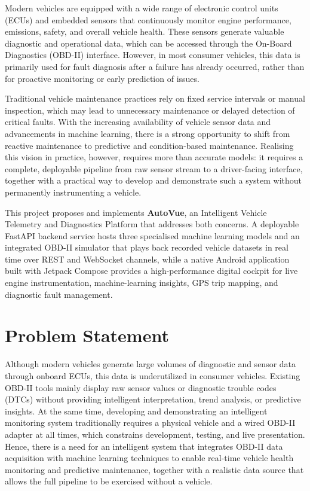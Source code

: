 \documentclass[10pt,a4paper]{report}
\begin{document}
Modern vehicles are equipped with a wide range of electronic control units (ECUs) and embedded sensors that continuously monitor engine performance, emissions, safety, and overall vehicle health. These sensors generate valuable diagnostic and operational data, which can be accessed through the On-Board Diagnostics (OBD-II) interface. However, in most consumer vehicles, this data is primarily used for fault diagnosis after a failure has already occurred, rather than for proactive monitoring or early prediction of issues.
\par
Traditional vehicle maintenance practices rely on fixed service intervals or manual inspection, which may lead to unnecessary maintenance or delayed detection of critical faults. With the increasing availability of vehicle sensor data and advancements in machine learning, there is a strong opportunity to shift from reactive maintenance to predictive and condition-based maintenance. Realising this vision in practice, however, requires more than accurate models: it requires a complete, deployable pipeline from raw sensor stream to a driver-facing interface, together with a practical way to develop and demonstrate such a system without permanently instrumenting a vehicle.
\par
This project proposes and implements \textbf{AutoVue}, an Intelligent Vehicle Telemetry and Diagnostics Platform that addresses both concerns. A deployable FastAPI backend service hosts three specialised machine learning models and an integrated OBD-II simulator that plays back recorded vehicle datasets in real time over REST and WebSocket channels, while a native Android application built with Jetpack Compose provides a high-performance digital cockpit for live engine instrumentation, machine-learning insights, GPS trip mapping, and diagnostic fault management.

\section{Problem Statement}

Although modern vehicles generate large volumes of diagnostic and sensor data through onboard ECUs, this data is underutilized in consumer vehicles. Existing OBD-II tools mainly display raw sensor values or diagnostic trouble codes (DTCs) without providing intelligent interpretation, trend analysis, or predictive insights. At the same time, developing and demonstrating an intelligent monitoring system traditionally requires a physical vehicle and a wired OBD-II adapter at all times, which constrains development, testing, and live presentation. Hence, there is a need for an intelligent system that integrates OBD-II data acquisition with machine learning techniques to enable real-time vehicle health monitoring and predictive maintenance, together with a realistic data source that allows the full pipeline to be exercised without a vehicle.
\end{document}

